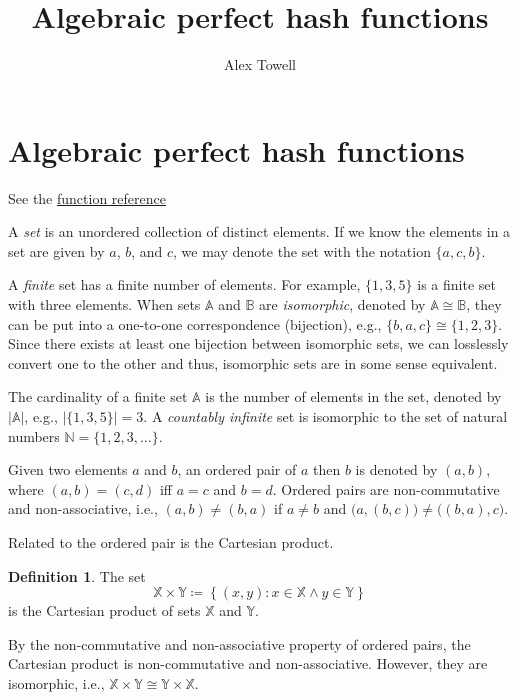 \documentclass[
]{article}
\title{Algebraic perfect hash functions}
\author{Alex Towell}
\date{}
\theoremstyle{definition}
\newtheorem{definition}{Definition}[section]
\theoremstyle{definition}
\theoremstyle{definition}
\theoremstyle{definition}
\theoremstyle{remark}
\begin{document}
\maketitle

{
\setcounter{tocdepth}{2}
\tableofcontents
}
\hypertarget{algebraic-perfect-hash-functions}{%
\section{Algebraic perfect hash functions}\label{algebraic-perfect-hash-functions}}

See the \href{https://queelius.github.io/perfect_hash_functions/index.html}{function reference}

A \emph{set} is an unordered collection of distinct elements.
If we know the elements in a set are given by \(a\), \(b\), and \(c\), we may denote
the set with the notation \(\{a,c,b\}\).

A \emph{finite} set has a finite number of elements.
For example, \(\{ 1, 3, 5 \}\) is a finite set with three elements.
When sets \(\mathbb{A}\) and \(\mathbb{B}\) are \emph{isomorphic}, denoted by
\(\mathbb{A} \cong \mathbb{B}\), they can be put into a one-to-one correspondence
(bijection), e.g., \(\{b,a,c\} \cong \{1,2,3\}\).
Since there exists at least one bijection between isomorphic sets, we can
losslessly convert one to the other and thus, isomorphic sets are in some sense
equivalent.

The cardinality of a finite set \(\mathbb{A}\) is the number of elements in the
set, denoted by \(|\mathbb{A}|\), e.g., \(|\{ 1, 3, 5\}| = 3\).
A \emph{countably infinite} set is isomorphic to the set of natural numbers
\(\mathbb{N} = \{1,2,3,\ldots\}\).

Given two elements \(a\) and \(b\), an ordered pair of \(a\) then \(b\) is denoted by
\((a,b)\), where \((a,b) = (c,d)\) iff \(a = c\) and \(b = d\).
Ordered pairs are non-commutative and non-associative, i.e., \((a,b) \neq (b,a)\)
if \(a \neq b\) and \(\bigl(a,(b,c)\bigr) \neq \bigl((b,a),c\bigr)\).

Related to the ordered pair is the Cartesian product.

\begin{definition}
The set
\[
\mathbb{X} \times \mathbb{Y} \coloneqq \left\{(x,y) \colon x \in 
\mathbb{X} \land y \in \mathbb{Y}\right\}
\]
is the Cartesian product of sets \(\mathbb{X}\) and \(\mathbb{Y}\).
\end{definition}

By the non-commutative and non-associative property of ordered pairs, the
Cartesian product is non-commutative and non-associative.
However, they are isomorphic, i.e.,
\(\mathbb{X} \times \mathbb{Y} \cong \mathbb{Y} \times \mathbb{X}\).
\end{document}
